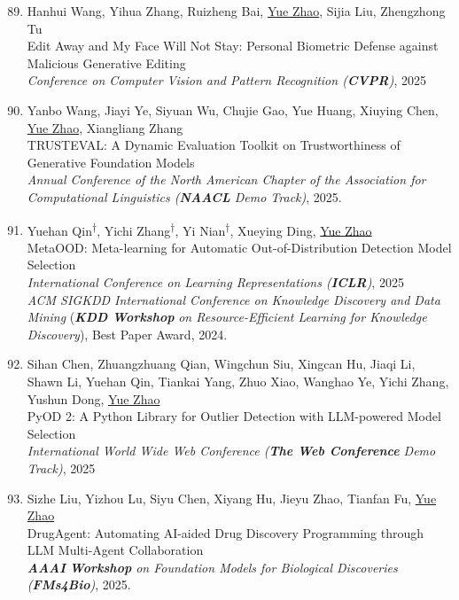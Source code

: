 \documentclass[margin,line,pifont,palatino,courier]{res}
\newcommand{\equalcontrib}{\textsuperscript{$\dagger$}}
\newenvironment{benumerate}[1]{
    \let\oldItem\item
    \def\item{\addtocounter{enumi}{-2}\oldItem}
    \begin{enumerate}[leftmargin=0.25in,label=\textcolor{uscred}{\arabic*.}]
    \setcounter{enumi}{#1}
    \addtocounter{enumi}{1}
}{
    \end{enumerate}
}
\begin{document}
\begin{resume}
\begin{benumerate}{88}
    \item Hanhui Wang, Yihua Zhang, Ruizheng Bai, \underline{Yue Zhao}, Sijia Liu, Zhengzhong Tu\\
    Edit Away and My Face Will Not Stay: Personal Biometric Defense against Malicious Generative Editing\\
    \textit{Conference on Computer Vision and Pattern Recognition (\textbf{CVPR})}, 2025

    \item Yanbo Wang, Jiayi Ye, Siyuan Wu, Chujie Gao, Yue Huang, Xiuying Chen, \underline{Yue Zhao}, Xiangliang Zhang\\
    TRUSTEVAL: A Dynamic Evaluation Toolkit on Trustworthiness of Generative Foundation Models\\
    \textit{Annual Conference of the North American Chapter of the Association for Computational Linguistics (\textbf{NAACL} Demo Track)}, 2025.

    \item Yuehan Qin\equalcontrib, Yichi Zhang\equalcontrib, Yi Nian\equalcontrib, Xueying Ding, \underline{Yue Zhao} \\
    MetaOOD: Meta-learning for Automatic Out-of-Distribution Detection Model Selection \\
    {\textit{International Conference on Learning Representations (\textbf{ICLR})}, 2025} \\
    \textit{ACM SIGKDD International Conference on Knowledge Discovery and Data Mining} (\textbf{\textit{KDD Workshop}} \textit{on Resource-Efficient Learning for Knowledge Discovery}), \textcolor{uscred}{\faAward \xspace Best Paper Award}, 2024. 



    \item Sihan Chen, Zhuangzhuang Qian, Wingchun Siu, Xingcan Hu, Jiaqi Li, Shawn Li, Yuehan Qin, Tiankai Yang, Zhuo Xiao, Wanghao Ye, Yichi Zhang, Yushun Dong, \underline{Yue Zhao}\\
    PyOD 2: A Python Library for Outlier Detection with LLM-powered Model Selection\\
    {\textit{International World Wide Web Conference (\textbf{The Web Conference} Demo Track)}, 2025}

    \item Sizhe Liu, Yizhou Lu, Siyu Chen, Xiyang Hu, Jieyu Zhao, Tianfan Fu, \underline{Yue Zhao} \\
    DrugAgent: Automating AI-aided Drug Discovery Programming through LLM Multi-Agent Collaboration\\
    \textit{\textbf{AAAI} \textbf{Workshop} on Foundation Models for Biological Discoveries (\textbf{FMs4Bio})}, 2025.


\end{benumerate}
\end{resume}
\end{document}
